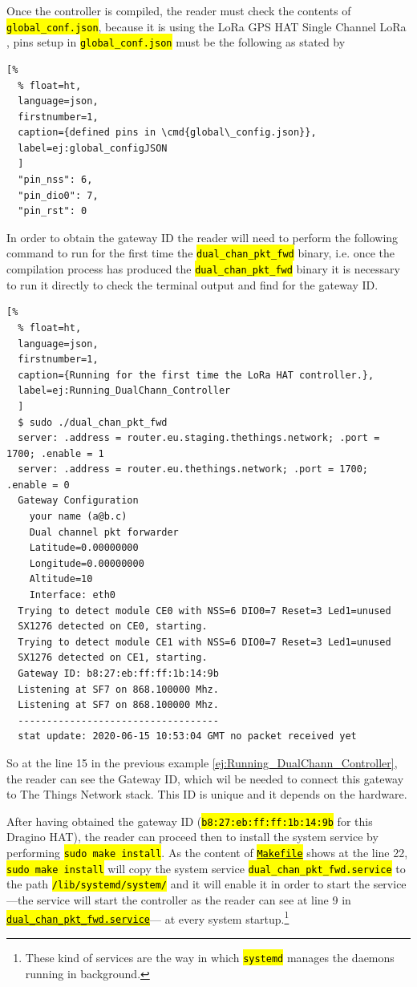 \documentclass[11pt,a4paper,dvipsnames,twoside]{article}
\newcommand{\cmd}[1] {\hl{\texttt{#1}}}
\begin{document}
Once the controller is compiled, the reader must check the contents of \cmd{global\_conf.json}, because it is using the LoRa GPS HAT Single Channel LoRa \cite{DraginoRpiHat}, pins setup in \cmd{global\_conf.json} must be the following as stated by \cite{Dragino_DualChannelController_Rpi}

\begin{lstlisting}[%
  % float=ht,
  language=json,
  firstnumber=1,
  caption={defined pins in \cmd{global\_config.json}},
  label=ej:global_configJSON
  ]
  "pin_nss": 6,
  "pin_dio0": 7,
  "pin_rst": 0
\end{lstlisting}

In order to obtain the gateway ID the reader will need to perform the following command to run for the first time the \cmd{dual\_chan\_pkt\_fwd} binary, i.e. once the compilation process has produced the \cmd{dual\_chan\_pkt\_fwd} binary it is necessary to run it directly to check the terminal output and find for the gateway ID.

\begin{lstlisting}[%
  % float=ht,
  language=json,
  firstnumber=1,
  caption={Running for the first time the LoRa HAT controller.},
  label=ej:Running_DualChann_Controller
  ]
  $ sudo ./dual_chan_pkt_fwd
  server: .address = router.eu.staging.thethings.network; .port = 1700; .enable = 1
  server: .address = router.eu.thethings.network; .port = 1700; .enable = 0
  Gateway Configuration
    your name (a@b.c)
    Dual channel pkt forwarder
    Latitude=0.00000000
    Longitude=0.00000000
    Altitude=10
    Interface: eth0
  Trying to detect module CE0 with NSS=6 DIO0=7 Reset=3 Led1=unused
  SX1276 detected on CE0, starting.
  Trying to detect module CE1 with NSS=6 DIO0=7 Reset=3 Led1=unused
  SX1276 detected on CE1, starting.
  Gateway ID: b8:27:eb:ff:ff:1b:14:9b
  Listening at SF7 on 868.100000 Mhz.
  Listening at SF7 on 868.100000 Mhz.
  -----------------------------------
  stat update: 2020-06-15 10:53:04 GMT no packet received yet 
\end{lstlisting}

So at the line 15 in the previous example \ref{ej:Running_DualChann_Controller}, the reader can see the Gateway ID, which wil be needed to connect this gateway to The Things Network stack. This ID is unique and it depends on the hardware.

After having obtained the gateway ID (\cmd{b8:27:eb:ff:ff:1b:14:9b} for this Dragino HAT), the reader can proceed then to install the system service by performing \cmd{sudo make install}. As the content of \href{https://github.com/dragino/dual_chan_pkt_fwd/blob/master/Makefile#L22}{\cmd{Makefile}} shows at the line 22, \cmd{sudo make install} will copy the system service \cmd{dual\_chan\_pkt\_fwd.service} to the path \cmd{/lib/systemd/system/} and it will enable it in order to start the service ---the service will start the controller as the reader can see at line 9 in \href{https://github.com/dragino/dual_chan_pkt_fwd/blob/master/dual_chan_pkt_fwd.service#L9}{\cmd{dual\_chan\_pkt\_fwd.service}}--- at every system startup.\footnote{These kind of services are the way in which \cmd{systemd} manages the daemons running in background.} 
\end{document}
